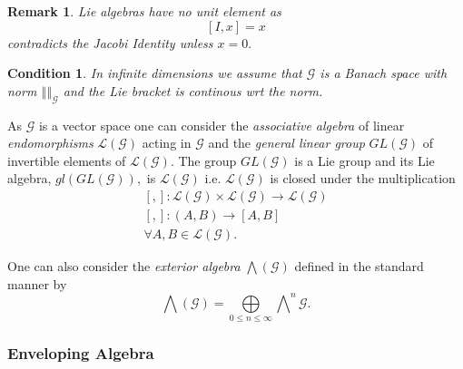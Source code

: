 \documentclass[aps,preprint]{revtex4}%
\newtheorem{condition}[theorem]{Condition}
\newtheorem{remark}[theorem]{Remark}
\begin{document}
\begin{remark}
Lie algebras have no unit element as
\begin{equation}
\left[  I,x\right]  =x
\end{equation}
contradicts the Jacobi Identity unless $x=0.$
\end{remark}

\begin{condition}
In infinite dimensions we assume that $\mathcal{G}$ is a Banach space with
norm $\left\Vert {}\right\Vert _{\mathcal{G}}$ and the Lie bracket is
continous wrt the norm.
\end{condition}

As $\mathcal{G}$ is a vector space one can consider the \emph{associative
algebra} of linear \emph{endomorphisms} $\mathcal{L}\left(  \mathcal{G}%
\right)  $ acting in $\mathcal{G}$ and the \emph{general linear group}
$GL\left(  \mathcal{G}\right)  $ of invertible elements of $\mathcal{L}\left(
\mathcal{G}\right)  .$ The group $GL\left(  \mathcal{G}\right)  $ is a Lie
group and its Lie algebra, $gl\left(  GL\left(  \mathcal{G}\right)  \right)
,$ is $\mathcal{L}\left(  \mathcal{G}\right)  $ i.e. $\mathcal{L}\left(
\mathcal{G}\right)  $ is closed under the multiplication
\begin{gather}
\left[  ,\right]  :\mathcal{L}\left(  \mathcal{G}\right)  \times
\mathcal{L}\left(  \mathcal{G}\right)  \rightarrow\mathcal{L}\left(
\mathcal{G}\right) \\
\left[  ,\right]  :\left(  A,B\right)  \rightarrow\left[  A,B\right] \\
\forall A,B\in\mathcal{L}\left(  \mathcal{G}\right)  .
\end{gather}


One can also consider the \emph{exterior algebra} $%
{\textstyle\bigwedge}
\left(  \mathcal{G}\right)  $ defined in the standard manner by
\begin{equation}%
{\textstyle\bigwedge}
\left(  \mathcal{G}\right)  =%
{\textstyle\bigoplus\limits_{0\leq n\leq\infty}}
{\textstyle\bigwedge\nolimits^{n}}
\mathcal{G}.
\end{equation}


\subsubsection{Enveloping Algebra}
\end{document}
